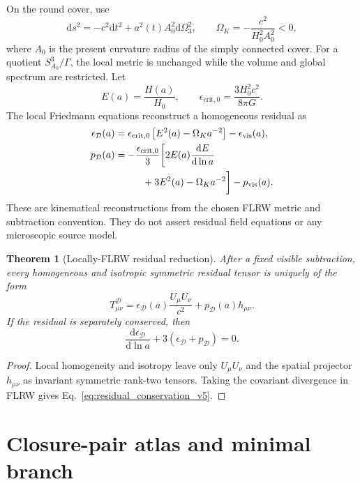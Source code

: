 \documentclass[
  aps,
  prd,
  reprint,
  superscriptaddress,
  floatfix,
  nofootinbib,
  longbibliography
]{revtex4-2}
\theoremstyle{plain}
\newtheorem{theorem}{Theorem}
\theoremstyle{definition}
\theoremstyle{remark}
\newcommand{\dd}{\mathrm d}
\newcommand{\D}{\mathcal D}
\newcommand{\vis}{\mathrm{vis}}
\newcommand{\crit}{\mathrm{crit}}
\newcommand{\Ok}{\Omega_K}
\newcommand{\eps}{\epsilon}
\begin{document}
On the round cover, use
\begin{equation}
\dd s^2=-c^2\dd t^2+a^2(t)A_0^2\dd\Omega_3^2,
\qquad
\Ok=-\frac{c^2}{H_0^2A_0^2}<0,
\label{eq:closed_metric_v5}
\end{equation}
where \(A_0\) is the present curvature radius of the simply connected cover.
For a quotient \(S^3_{A_0}/\Gamma\), the local metric is unchanged while the
volume and global spectrum are restricted.  Let
\begin{equation}
E(a)=\frac{H(a)}{H_0},
\qquad
\eps_{\crit,0}=\frac{3H_0^2c^2}{8\pi G} .
\end{equation}
The local Friedmann equations reconstruct a homogeneous residual as
\begin{align}
\eps_\D(a)
&=\eps_{\crit,0}\left[E^2(a)-\Ok a^{-2}\right]
-\eps_{\vis}(a),
\label{eq:eps_reconstruction_v5}\\
p_\D(a)
&=-\frac{\eps_{\crit,0}}{3}\biggl[
2E(a)\frac{\dd E}{\dd\ln a}
\nonumber\\
&\hspace{1.0cm}
+3E^2(a)-\Ok a^{-2}
\biggr]-p_{\vis}(a).
\label{eq:p_reconstruction_v5}
\end{align}
These are kinematical reconstructions from the chosen FLRW metric and subtraction convention.  They do not assert residual field equations or any microscopic source model.

\begin{theorem}[Locally-FLRW residual reduction]
After a fixed visible subtraction, every homogeneous and isotropic symmetric
residual tensor is uniquely of the form
\begin{equation}
T^\D_{\mu\nu}=\eps_\D(a)\frac{U_\mu U_\nu}{c^2}+p_\D(a)h_{\mu\nu} .
\label{eq:flrw_residual_tensor_v5}
\end{equation}
If the residual is separately conserved, then
\begin{equation}
\frac{\dd\eps_\D}{\dd\ln a}+3(\eps_\D+p_\D)=0 .
\label{eq:residual_conservation_v5}
\end{equation}
\end{theorem}

\begin{proof}
Local homogeneity and isotropy leave only \(U_\mu U_\nu\) and the spatial
projector \(h_{\mu\nu}\) as invariant symmetric rank-two tensors.  Taking the
covariant divergence in FLRW gives Eq.~\eqref{eq:residual_conservation_v5}.
\end{proof}

\section{Closure-pair atlas and minimal branch}
\end{document}
